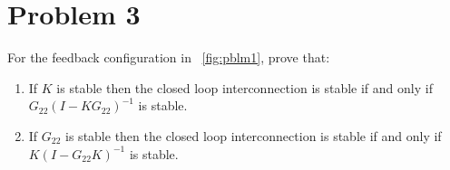 \documentclass[letter]{article}
\numberwithin{equation}{section}
\begin{document}
\newpage
\section{Problem 3}
For the feedback configuration in \figurename \ \ref{fig:pblm1}, prove that:
\begin{enumerate}
    \item If $K$ is stable then the closed loop interconnection is stable if and only if $G_{22} (I-K G_{22})^{-1}$ is stable.
    \item If $G_{22}$ is stable then the closed loop interconnection is stable if and only if $K (I - G_{22} K)^{-1}$ is stable.
\end{enumerate}






















\newpage
\end{document}
